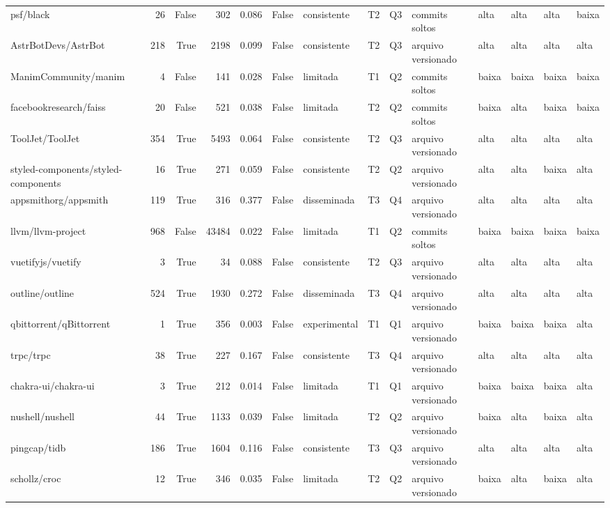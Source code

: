 \begin{tabular}{lrrrrrllllllll}
psf/black & 26 & False & 302 & 0.086 & False & consistente & T2 & Q3 & commits soltos & alta & alta & alta & baixa \\
AstrBotDevs/AstrBot & 218 & True & 2198 & 0.099 & False & consistente & T2 & Q3 & arquivo versionado & alta & alta & alta & alta \\
ManimCommunity/manim & 4 & False & 141 & 0.028 & False & limitada & T1 & Q2 & commits soltos & baixa & baixa & baixa & baixa \\
facebookresearch/faiss & 20 & False & 521 & 0.038 & False & limitada & T2 & Q2 & commits soltos & baixa & alta & baixa & baixa \\
ToolJet/ToolJet & 354 & True & 5493 & 0.064 & False & consistente & T2 & Q3 & arquivo versionado & alta & alta & alta & alta \\
styled-components/styled-components & 16 & True & 271 & 0.059 & False & consistente & T2 & Q2 & arquivo versionado & alta & alta & baixa & alta \\
appsmithorg/appsmith & 119 & True & 316 & 0.377 & False & disseminada & T3 & Q4 & arquivo versionado & alta & alta & alta & alta \\
llvm/llvm-project & 968 & False & 43484 & 0.022 & False & limitada & T1 & Q2 & commits soltos & baixa & baixa & baixa & baixa \\
vuetifyjs/vuetify & 3 & True & 34 & 0.088 & False & consistente & T2 & Q3 & arquivo versionado & alta & alta & alta & alta \\
outline/outline & 524 & True & 1930 & 0.272 & False & disseminada & T3 & Q4 & arquivo versionado & alta & alta & alta & alta \\
qbittorrent/qBittorrent & 1 & True & 356 & 0.003 & False & experimental & T1 & Q1 & arquivo versionado & baixa & baixa & baixa & alta \\
trpc/trpc & 38 & True & 227 & 0.167 & False & consistente & T3 & Q4 & arquivo versionado & alta & alta & alta & alta \\
chakra-ui/chakra-ui & 3 & True & 212 & 0.014 & False & limitada & T1 & Q1 & arquivo versionado & baixa & baixa & baixa & alta \\
nushell/nushell & 44 & True & 1133 & 0.039 & False & limitada & T2 & Q2 & arquivo versionado & baixa & alta & baixa & alta \\
pingcap/tidb & 186 & True & 1604 & 0.116 & False & consistente & T3 & Q3 & arquivo versionado & alta & alta & alta & alta \\
schollz/croc & 12 & True & 346 & 0.035 & False & limitada & T2 & Q2 & arquivo versionado & baixa & alta & baixa & alta \\

\end{tabular}
